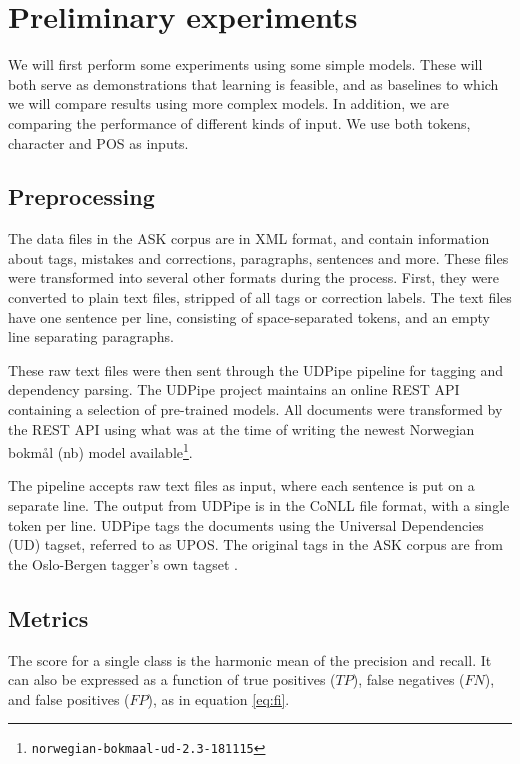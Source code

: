 \chapter{Preliminary experiments}

We will first perform some experiments using some simple models. These will
both serve as demonstrations that learning is feasible, and as baselines to
which we will compare results using more complex models. In addition, we are
comparing the performance of different kinds of input. We use both tokens,
character \ngrams and \ac{POS} \ngrams as inputs.


\section{Preprocessing}

The data files in the ASK corpus are in \ac{XML} format, and contain
information about tags, mistakes and corrections, paragraphs, sentences and
more. These files were transformed into several other formats during the
process. First, they were converted to plain text files, stripped of all tags
or correction labels. The text files have one sentence per line, consisting
of space-separated tokens, and an empty line separating paragraphs.

These raw text files were then sent through the UDPipe pipeline
\autocite{udpipe:2017} for tagging and dependency parsing. The UDPipe project
maintains an online REST \ac{API} containing a selection of pre-trained
models. All documents were transformed by the REST \ac{API} using what was at
the time of writing the newest Norwegian bokmål (nb) model
available\footnote{\texttt{norwegian-bokmaal-ud-2.3-181115}}.

The pipeline accepts raw text files as input, where each sentence is put on a
separate line. The output from UDPipe is in the CoNLL file format, with a
single token per line. UDPipe tags the documents using the Universal
Dependencies (UD) tagset, referred to as UPOS. The original tags in the ASK
corpus are from the Oslo-Bergen tagger's own tagset \autocite{oslobergen}.


\section{Metrics}

The \FI score for a single class is the harmonic mean of the precision and
recall. It can also be expressed as a function of true positives ($TP$),
false negatives ($FN$), and false positives ($FP$), as in equation
\ref{eq:fi}.

